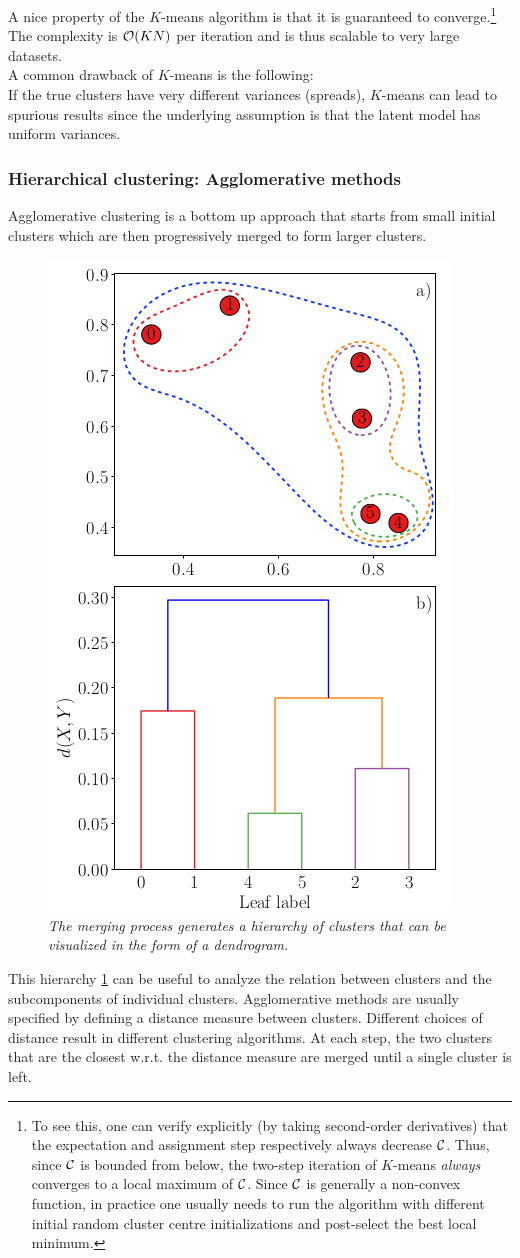 A nice property of the $K$-means algorithm is that it is guaranteed to converge.\footnote{To see this, one can verify explicitly (by taking second-order derivatives) that the expectation and assignment step respectively always decrease $\mathcal{C}$. Thus, since $\mathcal{C}$ is bounded from below, the two-step iteration of $K$-means \emph{always} converges to a local maximum of $\mathcal{C}$. Since $\mathcal{C}$ is generally a non-convex function, in practice one usually needs to run the algorithm with different initial random cluster centre initializations and post-select the best local minimum.} The complexity is $\mathcal{O}(KN)$ per iteration and is thus scalable to very large datasets.\\
A common drawback of $K$-means is the following:\\
If the true clusters have very different variances (spreads), $K$-means can lead to spurious results since the underlying assumption is that the latent model has uniform variances.

\subsubsection{Hierarchical clustering: Agglomerative methods}
\label{subsubsec:clusterPracticalHierarchical}
Agglomerative clustering is a bottom up approach that starts from small initial clusters which are then progressively merged to form larger clusters.
\begin{figure}[h!]
	\centering
	\includegraphics[width=0.4\linewidth]{gfx/HierarchicalCLustering}
	\caption{\itshape The merging process generates a hierarchy of clusters that can be visualized in the form of a dendrogram.}
	\label{fig:hierarchicalclustering}
\end{figure}
This hierarchy \ref{fig:hierarchicalclustering} can be useful to analyze the relation between clusters and the subcomponents of individual clusters. Agglomerative methods are usually specified by defining a distance measure between clusters. Different choices of distance result in different clustering algorithms. At each step, the two clusters that are the closest w.r.t. the distance measure are merged until a single cluster is left.

